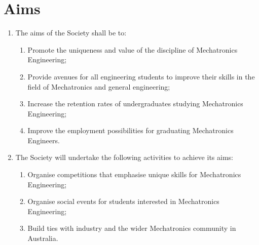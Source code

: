 \documentclass[11pt]{article}
\begin{document}
\section{Aims}
\begin{enumerate}[\thesection .1]
    \item The aims of the Society shall be to:
    \begin{enumerate}
        \item Promote the uniqueness and value of the discipline of Mechatronics Engineering;
        \item Provide avenues for all engineering students to improve their skills in the field of Mechatronics and general engineering;
        \item Increase the retention rates of undergraduates studying Mechatronics Engineering;
        \item Improve the employment possibilities for graduating Mechatronics Engineers.
    \end{enumerate}
    \item The Society will undertake the following activities to achieve its aims:
    \begin{enumerate}
        \item Organise competitions that emphasise unique skills for Mechatronics Engineering;
        \item Organise social events for students interested in Mechatronics Engineering;
        \item Build ties with industry and the wider Mechatronics community in Australia.
    \end{enumerate}
\end{enumerate}
\end{document}
